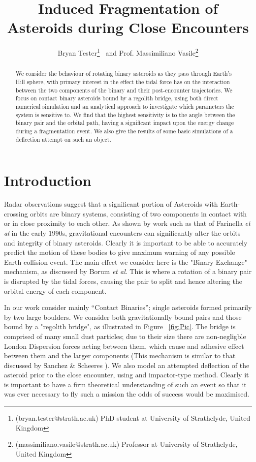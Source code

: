 \documentclass[letterpaper, preprint, paper,11pt]{AAS}	%
\begin{document}
\title{\textsf{\textbf{Induced Fragmentation of Asteroids during Close Encounters}}}
\author{\textsf{Bryan Tester}\thanks{(bryan.tester@strath.ac.uk) PhD student at University of Strathclyde, United Kingdom}
\ and \textsf{Prof. Massimiliano Vasile}\thanks{(massimiliano.vasile@strath.ac.uk) Professor at University of Strathclyde, United Kingdom}}

\maketitle{} 		


\begin{abstract}
We consider the behaviour of rotating binary asteroids as they pass through Earth's Hill sphere, with primary interest in the effect the tidal force has on the interaction between the two components of the binary and their post-encounter trajectories. We focus on contact binary asteroids bound by a regolith bridge, using both direct numerical simulation and an analytical approach to investigate which parameters the system is sensitive to. We find that the highest sensitivity is to the angle between the binary pair and the orbital path, having a significant impact upon the energy change during a fragmentation event. We also give the results of some basic simulations of a deflection attempt on such an object.
\end{abstract}

\section{Introduction}
Radar observations suggest that a significant portion of Asteroids with Earth-crossing orbits are binary systems, consisting of two components in contact with or in close proximity to each other. As shown by work such as that of Farinella \textit{et al} \cite{binaryevo} in the early 1990s, gravitational encounters can significantly alter the orbits and integrity of binary asteroids. Clearly it is important to be able to accurately predict the motion of these bodies to give maximum warning of any possible Earth collision event. The main effect we consider here is the "Binary Exchange" mechanism, as discussed by Borum \textit{et al}\cite{exchange}. This is where a rotation of a binary pair is disrupted by the tidal forces, causing the pair to split and hence altering the orbital energy of each component. 

In our work consider mainly “Contact Binaries”; single asteroids formed primarily by two large boulders. We consider both gravitationally bound pairs and those bound by a "regolith bridge", as illustrated in Figure ~\ref{fig:Pic}. The bridge is comprised of many small dust particles; due to their size there are non-negligble London Dispersion forces acting between them, which cause and adhesive effect between them and the larger components (This mechanism is similar to that discussed by Sanchez \& Scheeres \cite{dustbound}). We also model an attempted deflection of the asteroid prior to the close encounter, using and impactor-type method. Clearly it is important to have a firm theoretical understanding of such an event so that it was ever necessary to fly such a mission the odds of success would be maximised.
\end{document}
